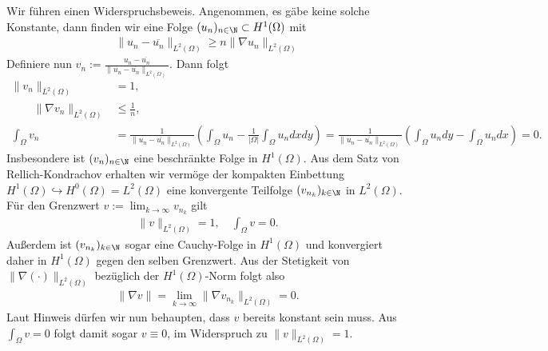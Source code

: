 \begin{solution}

Wir führen einen Widerspruchsbeweis. Angenommen, es gäbe keine solche Konstante,
dann finden wir eine Folge $(u_n)_{n \in \N} \subset H^1(\Omega)$ mit
\begin{align*}
  \|u_n - \overline{u_n}\|_{L^2(\Omega)} \geq n\|\nabla u_n\|_{L^2(\Omega)}
\end{align*}
Definiere nun $v_n := \frac{u_n - \overline{u_n}}{\|u_n - \overline{u_n}\|_{L^2(\Omega)}}$.
Dann folgt
\begin{align*}
  \|v_n\|_{L^2(\Omega)} &= 1, \\
  \qquad \|\nabla v_n\|_{L^2(\Omega)} &\leq \frac{1}{n}, \\
  \int_\Omega v_n &= \frac{1}{\|u_n -\overline{u_n}\|_{L^2(\Omega)}}
  \left(\int_{\Omega}u_n - \frac{1}{|\Omega|}\int_\Omega u_n dx dy\right)
  = \frac{1}{\|u_n -\overline{u_n}\|_{L^2(\Omega)}}
  \left(\int_{\Omega}u_n dy - \int_\Omega u_n dx\right) = 0.
\end{align*}
Insbesondere ist $(v_n)_{n \in \N}$ eine beschränkte Folge in $H^1(\Omega)$.
Aus dem Satz von Rellich-Kondrachov erhalten wir vermöge der kompakten Einbettung
$H^1(\Omega) \hookrightarrow H^0(\Omega) = L^2(\Omega)$ eine konvergente Teilfolge
$(v_{n_k})_{k\in \N}$ in $L^2(\Omega)$. Für den Grenzwert $v := \lim_{k \to \infty} v_{n_k}$ gilt
\begin{align*}
  \|v\|_{L^2(\Omega)} = 1, \quad \int_\Omega v = 0.
\end{align*}
Außerdem ist $(v_{n_k})_{k \in \N}$ sogar eine Cauchy-Folge in $H^1(\Omega)$
und konvergiert daher in $H^1(\Omega)$ gegen den selben Grenzwert.
Aus der Stetigkeit von $\|\nabla(\cdot)\|_{L^2(\Omega)}$ bezüglich der $H^1(\Omega)$-Norm
folgt also
\begin{align*}
  \|\nabla v\| = \lim_{k \to \infty}\|\nabla v_{n_k}\|_{L^2(\Omega)} = 0.
\end{align*}
Laut Hinweis dürfen wir nun behaupten, dass $v$ bereits konstant sein muss.
Aus $\int_\Omega v = 0$ folgt damit sogar $v \equiv 0$, im Widerspruch zu $\|v\|_{L^2(\Omega)} = 1$.
\end{solution}

